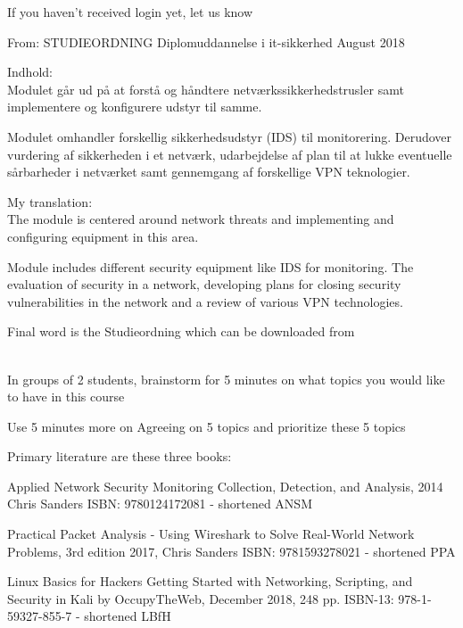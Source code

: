 \documentclass[Screen16to9,17pt]{foils}
\begin{document}

\vskip 5mm
\centerline{If you haven't received login yet, let us know}


From: STUDIEORDNING Diplomuddannelse i it-sikkerhed August 2018

Indhold:\\
Modulet går ud på at forstå og håndtere netværkssikkerhedstrusler samt implementere og
konfigurere udstyr til samme.

Modulet omhandler forskellig sikkerhedsudstyr (IDS) til monitorering. Derudover vurdering af sikkerheden i et netværk, udarbejdelse af plan til at lukke eventuelle sårbarheder i netværket samt gennemgang af forskellige VPN teknologier.

My translation:\\
The module is centered around network threats and implementing and configuring equipment in this area.

Module includes different security equipment like IDS for monitoring.
The evaluation of security in a network, developing plans for closing security vulnerabilities in the network and a review of various VPN technologies.

Final word is the Studieordning which can be downloaded from\\
{\footnotesize {}\\
}




In groups of 2 students, brainstorm for 5 minutes on what topics you would like to have in this course

Use 5 minutes more on Agreeing on 5 topics and prioritize these 5 topics





Primary literature are these three books:
\begin{list2}
\item Applied Network Security Monitoring Collection, Detection, and Analysis, 2014 Chris Sanders ISBN: 9780124172081 - shortened ANSM
\item Practical Packet Analysis - Using Wireshark to Solve Real-World Network Problems, 3rd edition 2017, Chris Sanders ISBN: 9781593278021 - shortened PPA
\item Linux Basics for Hackers Getting Started with Networking, Scripting, and Security in Kali by OccupyTheWeb, December 2018, 248 pp. ISBN-13: 978-1-59327-855-7 - shortened LBfH
\end{list2}
\end{document}
